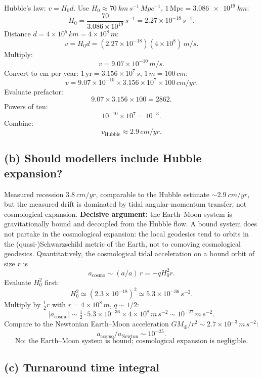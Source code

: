 \documentclass[11pt]{article}
\begin{document}
Hubble's law: $v=H_0 d$. Use $H_0\approx \SI{70}{km\,s^{-1}\,Mpc^{-1}}$, $1\,\text{Mpc}=\SI{3.086e19}{km}$:
\[ H_0=\frac{70}{3.086\times 10^{19}}\,\si{s^{-1}}=2.27\times 10^{-18}\,\si{s^{-1}}. \]
Distance $d=4\times 10^5\,\si{km}=4\times 10^{8}\,\si{m}$:
\[ v=H_0 d=(2.27\times 10^{-18})(4\times 10^{8})\,\si{m/s}. \]
Multiply:
\[ v=9.07\times 10^{-10}\,\si{m/s}. \]
Convert to cm per year: $1\,\text{yr}=3.156\times 10^{7}\,\si{s}$, $1\,\si{m}=100\,\si{cm}$:
\[ v=9.07\times 10^{-10}\times 3.156\times 10^{7}\times 100\,\si{cm/yr}. \]
Evaluate prefactor:
\[ 9.07\times 3.156\times 100=2862. \]
Powers of ten:
\[ 10^{-10}\times 10^{7}=10^{-3}. \]
Combine:
\[ \boxed{\;v_{\text{Hubble}}\approx 2.9\,\si{cm/yr}.\;} \]

\subsection*{(b) Should modellers include Hubble expansion?}

Measured recession $\SI{3.8}{cm/yr}$, comparable to the Hubble estimate $\sim\SI{2.9}{cm/yr}$, but the measured drift is dominated by tidal angular-momentum transfer, not cosmological expansion. \textbf{Decisive argument:} the Earth--Moon system is gravitationally bound and decoupled from the Hubble flow. A bound system does not partake in the cosmological expansion: the local geodesics tend to orbits in the (quasi-)Schwarzschild metric of the Earth, not to comoving cosmological geodesics. Quantitatively, the cosmological tidal acceleration on a bound orbit of size $r$ is
\[ a_{\text{cosmo}}\sim (\ddot a/a)\,r=-q H_0^2 r. \]
Evaluate $H_0^2$ first:
\[ H_0^2\simeq(2.3\times 10^{-18})^2\simeq 5.3\times 10^{-36}\,\si{s^{-2}}. \]
Multiply by $\tfrac12 r$ with $r=4\times 10^8\,\si{m}$, $q\sim 1/2$:
\[ |a_{\text{cosmo}}|\sim \tfrac12\cdot 5.3\times 10^{-36}\times 4\times 10^8\,\si{m\,s^{-2}}\sim 10^{-27}\,\si{m\,s^{-2}}. \]
Compare to the Newtonian Earth--Moon acceleration $GM_\oplus/r^2\sim 2.7\times 10^{-3}\,\si{m\,s^{-2}}$:
\[ a_{\text{cosmo}}/a_{\text{Newton}}\sim 10^{-25}. \]
\[ \boxed{\;\text{No: the Earth--Moon system is bound; cosmological expansion is negligible.}\;} \]

\subsection*{(c) Turnaround time integral}
\end{document}
